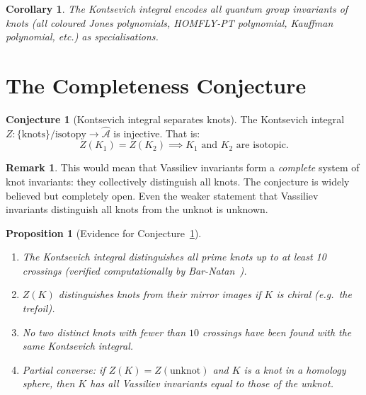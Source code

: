 \documentclass[12pt,a4paper]{amsart}
\newtheorem{corollary}[theorem]{Corollary}
\newtheorem{proposition}[theorem]{Proposition}
\theoremstyle{definition}
\newtheorem{remark}[theorem]{Remark}
\newtheorem{conjecture}[theorem]{Conjecture}
\begin{document}
\begin{corollary}
The Kontsevich integral encodes \emph{all} quantum group invariants of knots
(all coloured Jones polynomials, HOMFLY-PT polynomial, Kauffman polynomial, etc.)
as specialisations.
\end{corollary}

\section{The Completeness Conjecture}\label{sec:completeness}

\begin{conjecture}[Kontsevich integral separates knots]\label{conj:complete}
The Kontsevich integral $Z: \{\text{knots}\} / \text{isotopy} \to \hat{\mathcal{A}}$
is injective.  That is:
\[
  Z(K_1) = Z(K_2) \implies K_1 \text{ and } K_2 \text{ are isotopic.}
\]
\end{conjecture}

\begin{remark}
This would mean that Vassiliev invariants form a \emph{complete} system of
knot invariants: they collectively distinguish all knots.  The conjecture
is widely believed but completely open.  Even the weaker statement that
Vassiliev invariants distinguish all knots from the unknot is unknown.
\end{remark}

\begin{proposition}[Evidence for Conjecture~\ref{conj:complete}]
\begin{enumerate}[label=(\roman*)]
  \item The Kontsevich integral distinguishes all \emph{prime} knots up to
        at least 10 crossings (verified computationally by Bar-Natan~\cite{barnatan1995}).
  \item $Z(K)$ distinguishes knots from their mirror images if $K$ is
        chiral (e.g.\ the trefoil).
  \item No two distinct knots with fewer than $10$ crossings have been found
        with the same Kontsevich integral.
  \item Partial converse: if $Z(K) = Z(\text{unknot})$ and $K$ is a knot
        in a homology sphere, then $K$ has all Vassiliev invariants equal
        to those of the unknot.
\end{enumerate}
\end{proposition}
\end{document}
